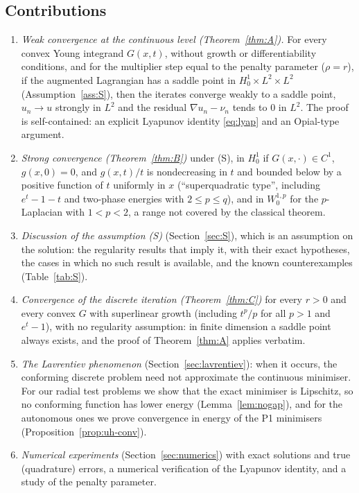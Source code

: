 \documentclass[11pt]{amsart}
\theoremstyle{definition}
\theoremstyle{remark}
\numberwithin{equation}{section}
\begin{document}
\subsection*{Contributions}
\begin{enumerate}[label=(\arabic*),leftmargin=2em]
\item \emph{Weak convergence at the continuous level (Theorem~\ref{thm:A}).} For every convex Young integrand $G(x,t)$, without growth or differentiability conditions, and for the multiplier step equal to the penalty parameter ($\rho=r$), if the augmented Lagrangian has a saddle point in $H^1_0\times L^2\times L^2$ (Assumption~\ref{ass:S}), then the iterates converge weakly to a saddle point, $u_n\to u$ strongly in $L^2$ and the residual $\nabla u_n-\nu_n$ tends to $0$ in $L^2$. The proof is self-contained: an explicit Lyapunov identity \eqref{eq:lyap} and an Opial-type argument.
\item \emph{Strong convergence (Theorem~\ref{thm:B})} under (S), in $H^1_0$ if $G(x,\cdot)\in C^1$, $g(x,0)=0$, and $g(x,t)/t$ is nondecreasing in $t$ and bounded below by a positive function of $t$ uniformly in $x$ (``superquadratic type'', including $e^t-1-t$ and two-phase energies with $2\le p\le q$), and in $W^{1,p}_0$ for the $p$-Laplacian with $1<p<2$, a range not covered by the classical theorem.
\item \emph{Discussion of the assumption (S)} (Section~\ref{sec:S}), which is an assumption on the solution: the regularity results that imply it, with their exact hypotheses, the cases in which no such result is available, and the known counterexamples (Table~\ref{tab:S}).
\item \emph{Convergence of the discrete iteration (Theorem~\ref{thm:C})} for every $r>0$ and every convex $G$ with superlinear growth (including $t^p/p$ for all $p>1$ and $e^t-1$), with no regularity assumption: in finite dimension a saddle point always exists, and the proof of Theorem~\ref{thm:A} applies verbatim.
\item \emph{The Lavrentiev phenomenon} (Section~\ref{sec:lavrentiev}): when it occurs, the conforming discrete problem need not approximate the continuous minimiser. For our radial test problems we show that the exact minimiser is Lipschitz, so no conforming function has lower energy (Lemma~\ref{lem:nogap}), and for the autonomous ones we prove convergence in energy of the P1 minimisers (Proposition~\ref{prop:uh-conv}).
\item \emph{Numerical experiments} (Section~\ref{sec:numerics}) with exact solutions and true (quadrature) errors, a numerical verification of the Lyapunov identity, and a study of the penalty parameter.
\end{enumerate}
\end{document}
